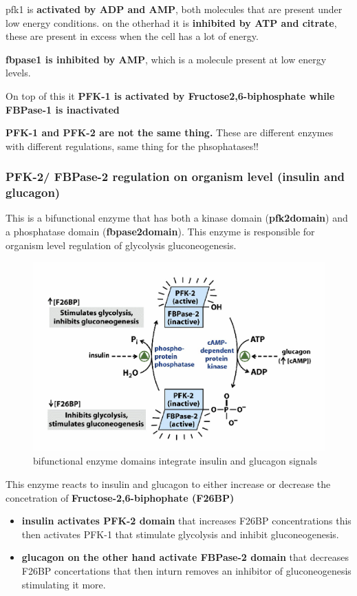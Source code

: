 \documentclass[../main.tex]{subfiles}
\begin{document}
\gls{pfk1} is\textbf{ activated by ADP and AMP}, both molecules that are present under low energy conditions. on the otherhad it is \textbf{inhibited by ATP and citrate}, these are present in excess when the cell has a lot of energy. 
\par
\textbf{\gls{fbpase1} is inhibited by AMP}, which is a molecule present at low energy levels.
\par
On top of this it \textbf{PFK-1 is activated by Fructose2,6-biphosphate while FBPase-1 is inactivated} 

\begin{remark}
    \textbf{PFK-1 and PFK-2 are not the same thing.} These are different enzymes with different regulations, same thing for the phsophatases!!
\end{remark}


\subsubsection{PFK-2/ FBPase-2 regulation on organism level (insulin and glucagon)}
This is a bifunctional enzyme that has both a kinase domain (\textbf{\gls{pfk2domain}}) and a phosphatase domain (\textbf{\gls{fbpase2domain}}). This enzyme is responsible for organism level regulation of glycolysis gluconeogenesis.
\begin{figure}[H]
    \centering
    \includegraphics[width=0.5\linewidth]{RegulationInsulin.png}
    \caption{bifunctional enzyme domains integrate insulin and glucagon signals}
    \label{fig:enter-label}
\end{figure}
This enzyme reacts to insulin and glucagon to either increase or decrease the concetration of\textbf{ Fructose-2,6-biphophate (F26BP)}
\begin{itemize}
    \item \textbf{insulin activates PFK-2 domain }that increases F26BP concentrations  this then activates PFK-1 that stimulate glycolysis and inhibit gluconeogenesis.
    \item \textbf{glucagon on the other hand activate FBPase-2 domain} that decreases F26BP concertations that then inturn removes an inhibitor of gluconeogenesis stimulating it more. 
\end{itemize}
\end{document}
